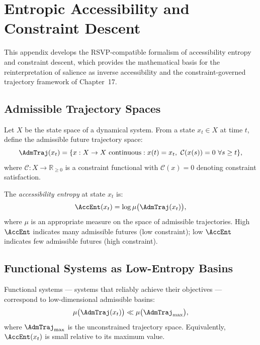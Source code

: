 
\chapter{Entropic Accessibility and Constraint Descent}
\label{app:entropy}

\noindent
This appendix develops the RSVP-compatible formalism
of accessibility entropy and constraint descent, which
provides the mathematical basis for the reinterpretation
of salience as inverse accessibility and the
constraint-governed trajectory framework of Chapter~17.

\section{Admissible Trajectory Spaces}
\label{app-e:admissible}

Let $X$ be the state space of a dynamical system.
From a state $x_t \in X$ at time $t$, define the
admissible future trajectory space:
\[
  \AdmTraj(x_t) = \{x : X \to X\text{ continuous} :
  x(t) = x_t,\ \mathcal{C}(x(s)) = 0\ \forall s \ge t\},
\]
where $\mathcal{C} : X \to \mathbb{R}_{\ge 0}$ is
a constraint functional with $\mathcal{C}(x) = 0$
denoting constraint satisfaction.

\begin{definition}
The \emph{accessibility entropy} at state $x_t$ is:
\[
  \AccEnt(x_t) = \log\mu\bigl(\AdmTraj(x_t)\bigr),
\]
where $\mu$ is an appropriate measure on the space
of admissible trajectories. High $\AccEnt$ indicates
many admissible futures (low constraint); low $\AccEnt$
indicates few admissible futures (high constraint).
\end{definition}

\section{Functional Systems as Low-Entropy Basins}
\label{app-e:functional}

Functional systems --- systems that reliably achieve
their objectives --- correspond to low-dimensional
admissible basins:
\[
  \mu\bigl(\AdmTraj(x_t)\bigr) \ll
  \mu\bigl(\AdmTraj_{\max}\bigr),
\]
where $\AdmTraj_{\max}$ is the unconstrained trajectory
space. Equivalently, $\AccEnt(x_t)$ is small relative
to its maximum value.

